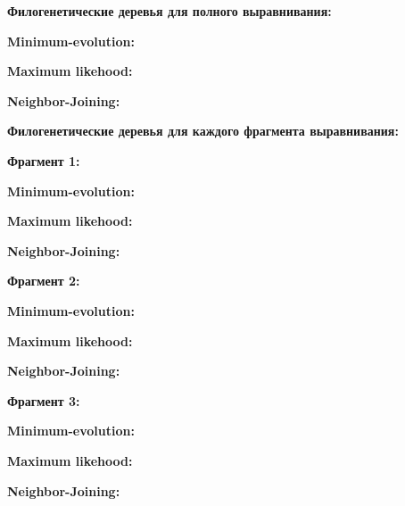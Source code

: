 \documentclass{article} %
\begin{document}
\textbf{Филогенетические деревья для полного выравнивания:}

\textbf{Minimum-evolution:}



\bigskip
\textbf{Maximum likehood:}



\bigskip
\textbf{Neighbor-Joining:}



\bigskip
\textbf{Филогенетические деревья для каждого фрагмента \mbox{выравнивания}:}

\textbf{Фрагмент 1:}

\textbf{Minimum-evolution:}



\bigskip
\textbf{Maximum likehood:}



\bigskip
\textbf{Neighbor-Joining:}



\bigskip
\textbf{Фрагмент 2:}

\textbf{Minimum-evolution:}



\bigskip
\textbf{Maximum likehood:}



\bigskip
\textbf{Neighbor-Joining:}



\bigskip
\textbf{Фрагмент 3:}

\textbf{Minimum-evolution:}



\bigskip
\textbf{Maximum likehood:}



\bigskip
\textbf{Neighbor-Joining:}


\end{document}
